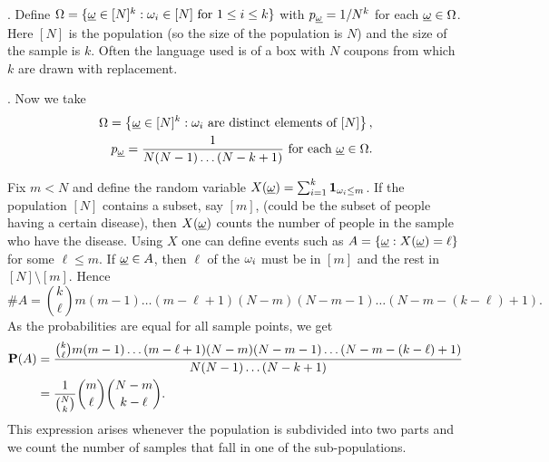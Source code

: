 \documentclass[preprint,  11pt]{amsart}
\def\omeg{\underline{\ome}}
\begin{document}
\beg {}. Define $\Ome=\{\omeg\in [N]^{k}\suchthat \ome_{i}\in [N] \mb{ for }1\le i\le k\}$ with $p_{\omeg}=1/N^{k}$ for each $\omeg\in \Ome$. Here $[N]$ is the population (so the size of the population is $N$) and the size of the sample is $k$. Often the language used is of a box with $N$ coupons from which $k$ are drawn with replacement.
\eeg

\beg {}. Now we take
\begin{align*}
\Ome=\l\{\omeg\in [N]^{k}\suchthat \ome_{i}\mb{ are distinct elements of } [N]\r\}, \\
p_{\omeg}=\frac{1}{N(N-1)\ldots (N-k+1)}  \mb{ for each }\omeg\in \Ome.
\end{align*}

Fix $m < N$ and define the random variable $X(\omeg)=\sum_{i=1}^{k}\one_{\ome_{i}\le m}$. If the population $[N]$ contains a subset, say $[m]$, (could be the subset of people having a certain disease), then $X(\omeg)$ counts the number of people in the sample who have the disease. Using $X$ one can define  events such as $A=\{\omeg\suchthat X(\omeg)=\ell\}$ for some $\ell\le m$. If $\omeg\in A$, then $\ell$ of the $\ome_{i}$ must be in $[m]$ and the rest in $[N]\setminus [m]$. Hence $$\#A=\binom{k}{\ell}m(m-1)\ldots (m-\ell+1)(N-m)(N-m-1)\ldots (N-m-(k-\ell)+1).$$
As the probabilities are equal for all sample points, we get
\begin{align*}
\P(A)&= \frac{\binom{k}{\ell}m(m-1)\ldots (m-\ell+1)(N-m)(N-m-1)\ldots (N-m-(k-\ell)+1)}{N(N-1)\ldots (N-k+1)} \\
 &= \frac{1}{\binom{N}{k}}\binom{m}{\ell}\binom{N-m}{k-\ell}.
\end{align*}
This expression arises whenever the population is subdivided into two parts and we count the number of samples that fall in one of the sub-populations.
\eeg
\end{document}
